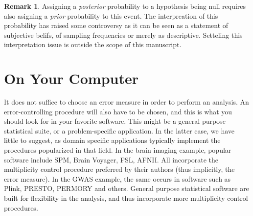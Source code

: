 \documentclass[review,12pt]{article}
\theoremstyle{definition}
\theoremstyle{definition}
\newtheorem{remark}{Remark}[section]
\begin{document}
\begin{remark}
Assigning a \emph{posterior} probability to a hypothesis being null requires also asigning a \emph{prior} probability to this event. The interpreation of this probability has raised some controversy \cite[e.g.][]{morris_comment:_2008} as it can be seen as a statement of subjective belifs, of sampling frequencies or merely as descriptive. Setteling this interpretation issue is outside the scope of this manuscript.
\end{remark}














\appendix

\section{\label{sec:on_your_pc} On Your Computer}
It does not suffice to choose an error measure in order to perform an analysis. An error-controlling procedure will also have to be chosen, and this is what you should look for in your favorite software. This might be a general purpose statistical suite, or a problem-specific application. In the latter case, we have little to suggest, as domain specific applications typically implement the procedures popularized in that field. 
In the brain imaging example, popular software include SPM, Brain Voyager, FSL, AFNII. All incorporate the multiplicity control procedure preferred by their authors (thus implicitly, the error measure). 
In the GWAS example, the same occurs in software such as Plink, PRESTO, PERMORY and others. 
General purpose statistical software are built for flexibility in the analysis, and thus incorporate more multiplicity control procedures. 
\end{document}
